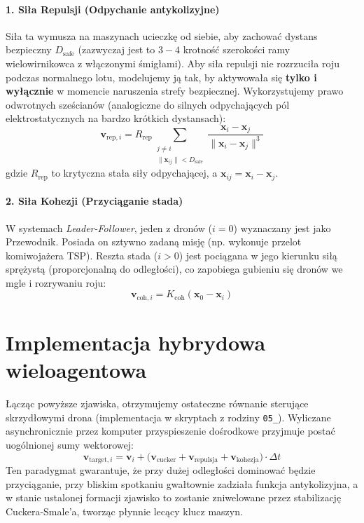 \paragraph{1. Siła Repulsji (Odpychanie antykolizyjne)}
Siła ta wymusza na maszynach ucieczkę od siebie, aby zachować dystans bezpieczny $D_{\text{safe}}$ (zazwyczaj jest to $3-4$ krotność szerokości ramy wielowirnikowca z włączonymi śmigłami). Aby siła repulsji nie rozrzuciła roju podczas normalnego lotu, modelujemy ją tak, by aktywowała się \textbf{tylko i wyłącznie} w momencie naruszenia strefy bezpiecznej. Wykorzystujemy prawo odwrotnych sześcianów (analogiczne do silnych odpychających pól elektrostatycznych na bardzo krótkich dystansach):
\begin{equation}
    \mathbf{v}_{\text{rep}, i} = R_{\text{rep}} \sum_{\substack{j \ne i \\ \|\mathbf{x}_{ij}\| < D_{\text{safe}}}} \frac{\mathbf{x}_i - \mathbf{x}_j}{\|\mathbf{x}_i - \mathbf{x}_j\|^3}
\end{equation}
gdzie $R_{\text{rep}}$ to krytyczna stała siły odpychającej, a $\mathbf{x}_{ij} = \mathbf{x}_i - \mathbf{x}_j$.

\paragraph{2. Siła Kohezji (Przyciąganie stada)}
W systemach \textit{Leader-Follower}, jeden z dronów ($i=0$) wyznaczany jest jako Przewodnik. Posiada on sztywno zadaną misję (np. wykonuje przelot komiwojażera TSP). Reszta stada ($i > 0$) jest pociągana w jego kierunku siłą sprężystą (proporcjonalną do odległości), co zapobiega gubieniu się dronów we mgle i rozrywaniu roju:
\begin{equation}
    \mathbf{v}_{\text{coh}, i} = K_{\text{coh}} (\mathbf{x}_0 - \mathbf{x}_i)
\end{equation}

\section{Implementacja hybrydowa wieloagentowa}

Łącząc powyższe zjawiska, otrzymujemy ostateczne równanie sterujące skrzydłowymi drona (implementacja w skryptach z rodziny \texttt{05\_}). Wyliczane asynchronicznie przez komputer przyspieszenie dośrodkowe przyjmuje postać uogólnionej sumy wektorowej:
\begin{equation}
    \mathbf{v}_{\text{target}, i} = \mathbf{v}_i + \Big( \mathbf{v}_{\text{cucker}} + \mathbf{v}_{\text{repulsja}} + \mathbf{v}_{\text{kohezja}} \Big) \cdot \Delta t
\end{equation}
Ten paradygmat gwarantuje, że przy dużej odległości dominować będzie przyciąganie, przy bliskim spotkaniu gwałtownie zadziała funkcja antykolizyjna, a w stanie ustalonej formacji zjawisko to zostanie zniwelowane przez stabilizację Cuckera-Smale'a, tworząc płynnie lecący klucz maszyn.

